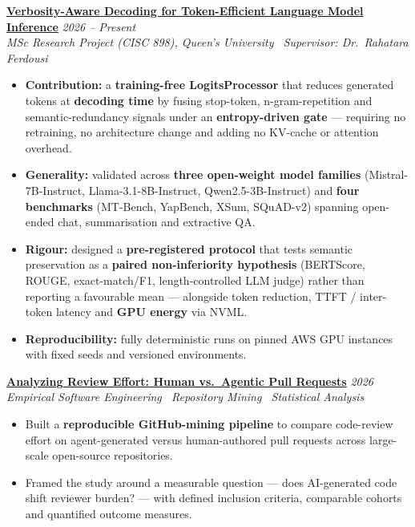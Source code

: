 \documentclass[10pt, a4paper]{article}
\newcommand{\cvproject}[3]{%
  \vspace{2.5pt}%
  {\bfseries\color{navy}#1} \hfill {\color{midgray}\textit{#3}}\\[-1.5pt]%
  {\color{teal}\textit{#2}}%
}
\newenvironment{cvitems}{%
  \begin{itemize}[leftmargin=11pt, itemsep=0.5pt, parsep=0pt, topsep=1pt,
                  label={\textcolor{teal}{$\bullet$}}]
}{%
  \end{itemize}%
}
\begin{document}
\cvproject{\href{https://github.com/MahmoudAlyosify/minimal-lm}{Verbosity-Aware Decoding for Token-Efficient Language Model Inference}}
          {MSc Research Project (CISC 898), Queen's University \textperiodcentered\ Supervisor: Dr.\ Rahatara Ferdousi}
          {2026 -- Present}
\begin{cvitems}
  \item \textbf{Contribution:} a \textbf{training-free LogitsProcessor} that reduces generated tokens at \textbf{decoding time} by fusing stop-token, n-gram-repetition and semantic-redundancy signals under an \textbf{entropy-driven gate} --- requiring no retraining, no architecture change and adding no KV-cache or attention overhead.
  \item \textbf{Generality:} validated across \textbf{three open-weight model families} (Mistral-7B-Instruct, Llama-3.1-8B-Instruct, Qwen2.5-3B-Instruct) and \textbf{four benchmarks} (MT-Bench, YapBench, XSum, SQuAD-v2) spanning open-ended chat, summarisation and extractive QA.
  \item \textbf{Rigour:} designed a \textbf{pre-registered protocol} that tests semantic preservation as a \textbf{paired non-inferiority hypothesis} (BERTScore, ROUGE, exact-match/F1, length-controlled LLM judge) rather than reporting a favourable mean --- alongside token reduction, TTFT / inter-token latency and \textbf{GPU energy} via NVML.
  \item \textbf{Reproducibility:} fully deterministic runs on pinned AWS GPU instances with fixed seeds and versioned environments.
\end{cvitems}

\cvproject{\href{https://github.com/MahmoudAlyosify/Analyzing-Review-Effort-in-Human-vs.-Agentic-Pull-Requests}{Analyzing Review Effort: Human vs.\ Agentic Pull Requests}}
          {Empirical Software Engineering \textperiodcentered\ Repository Mining \textperiodcentered\ Statistical Analysis}
          {2026}
\begin{cvitems}
  \item Built a \textbf{reproducible GitHub-mining pipeline} to compare code-review effort on agent-generated versus human-authored pull requests across large-scale open-source repositories.
  \item Framed the study around a measurable question --- does AI-generated code shift reviewer burden? --- with defined inclusion criteria, comparable cohorts and quantified outcome measures.
\end{cvitems}
\end{document}
